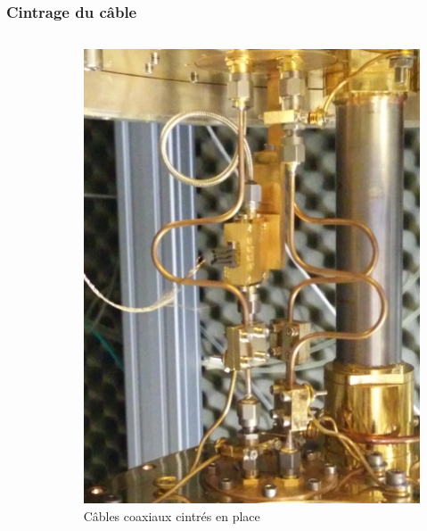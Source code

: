 \documentclass[8pt,a9paper]{beamer} \usepackage[utf8]{inputenc} \usepackage[francais]{babel} \usepackage[T1]{fontenc}
\begin{document}
\begin{frame}
\frametitle{Cintrage du câble}
\begin{columns}
\begin{column}{0.7\textwidth}
    \begin{description}
        \item[]~\\
    \end{description}
\end{column}
\begin{column}{0.3\textwidth}
\begin{figure}[h]
    \begin{center}
        \includegraphics[width=\textwidth]{Images/Coax/cintrage}
        \caption{Câbles coaxiaux cintrés en place}
    \end{center}
\end{figure}
\end{column}
\end{columns}
\end{frame}
\end{document}
